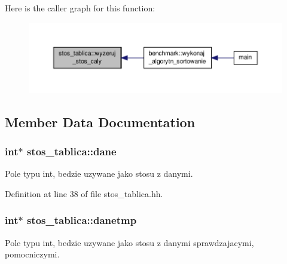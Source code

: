 Here is the caller graph for this function\-:
\nopagebreak
\begin{figure}[H]
\begin{center}
\leavevmode
\includegraphics[width=350pt]{classstos__tablica_aabebf0add57a2440cddd9b4305d165f8_icgraph}
\end{center}
\end{figure}




\subsection{Member Data Documentation}
\hypertarget{classstos__tablica_a008b0f69384d5d987782c2f24fcbd387}{
\subsubsection[{dane}]{\setlength{\rightskip}{0pt plus 5cm}int$\ast$ stos\-\_\-tablica\-::dane\hspace{0.3cm}{\ttfamily [private]}}}\label{classstos__tablica_a008b0f69384d5d987782c2f24fcbd387}


Pole typu int, bedzie uzywane jako stosu z danymi. 



Definition at line 38 of file stos\-\_\-tablica.\-hh.

\hypertarget{classstos__tablica_a2ee83414df31c2f56383199a5d47c755}{
\subsubsection[{danetmp}]{\setlength{\rightskip}{0pt plus 5cm}int$\ast$ stos\-\_\-tablica\-::danetmp\hspace{0.3cm}{\ttfamily [private]}}}\label{classstos__tablica_a2ee83414df31c2f56383199a5d47c755}


Pole typu int, bedzie uzywane jako stosu z danymi sprawdzajacymi, pomocniczymi. 



